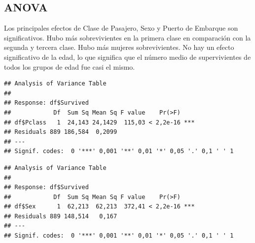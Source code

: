 \documentclass[]{article}
\newenvironment{Shaded}{\begin{snugshade}}{\end{snugshade}}
\newcommand{\KeywordTok}[1]{\textcolor[rgb]{0.13,0.29,0.53}{\textbf{#1}}}
\newcommand{\StringTok}[1]{\textcolor[rgb]{0.31,0.60,0.02}{#1}}
\newcommand{\OperatorTok}[1]{\textcolor[rgb]{0.81,0.36,0.00}{\textbf{#1}}}
\newcommand{\NormalTok}[1]{#1}
\begin{document}
\subsection{ANOVA}\label{anova}

Los principales efectos de Clase de Pasajero, Sexo y Puerto de Embarque
son significativos. Hubo más sobrevivientes en la primera clase en
comparación con la segunda y tercera clase. Hubo más mujeres
sobrevivientes. No hay un efecto significativo de la edad, lo que
significa que el número medio de supervivientes de todos los grupos de
edad fue casi el mismo.

\begin{Shaded}
\end{Shaded}

\begin{verbatim}
## Analysis of Variance Table
## 
## Response: df$Survived
##            Df  Sum Sq Mean Sq F value    Pr(>F)    
## df$Pclass   1  24,143 24,1429  115,03 < 2,2e-16 ***
## Residuals 889 186,584  0,2099                      
## ---
## Signif. codes:  0 '***' 0,001 '**' 0,01 '*' 0,05 '.' 0,1 ' ' 1
\end{verbatim}

\begin{Shaded}
\end{Shaded}

\begin{verbatim}
## Analysis of Variance Table
## 
## Response: df$Survived
##            Df  Sum Sq Mean Sq F value    Pr(>F)    
## df$Sex      1  62,213  62,213  372,41 < 2,2e-16 ***
## Residuals 889 148,514   0,167                      
## ---
## Signif. codes:  0 '***' 0,001 '**' 0,01 '*' 0,05 '.' 0,1 ' ' 1
\end{verbatim}

\begin{Shaded}
\end{Shaded}
\end{document}
